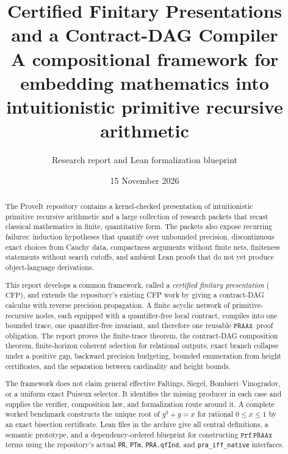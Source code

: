 \documentclass[11pt]{article}
\title{\textbf{Certified Finitary Presentations and a Contract-DAG Compiler}\\
\large A compositional framework for embedding mathematics into intuitionistic primitive recursive arithmetic}
\author{Research report and Lean formalization blueprint}
\date{15 November 2026}
\newcommand{\CFP}{\ensuremath{\mathrm{CFP}}}
\newcommand{\PRAAx}{\ensuremath{\mathtt{PRAAx}}}
\newcommand{\Prf}{\ensuremath{\mathtt{Prf}}}
\newcommand{\code}[1]{\texttt{#1}}
\begin{document}
\maketitle

\begin{abstract}
The ProveIt repository contains a kernel-checked presentation of intuitionistic
primitive recursive arithmetic and a large collection of research packets that
recast classical mathematics in finite, quantitative form.  The packets also
expose recurring failures: induction hypotheses that quantify over unbounded
precision, discontinuous exact choices from Cauchy data, compactness arguments
without finite nets, finiteness statements without search cutoffs, and ambient
Lean proofs that do not yet produce object-language derivations.

This report develops a common framework, called a \emph{certified finitary
presentation} (\CFP), and extends the repository's existing CFP work by giving
a contract-DAG calculus with reverse precision propagation.  A finite acyclic
network of primitive-recursive nodes, each equipped with a quantifier-free
local contract, compiles into one bounded trace, one quantifier-free invariant,
and therefore one reusable \PRAAx\ proof obligation.  The report proves the
finite-trace theorem, the contract-DAG composition theorem, finite-horizon
coherent selection for relational outputs, exact branch collapse under a
positive gap, backward precision budgeting, bounded enumeration from height
certificates, and the separation between cardinality and height bounds.

The framework does not claim general effective Faltings, Siegel,
Bombieri--Vinogradov, or a uniform exact Puiseux selector.  It identifies the
missing producer in each case and supplies the verifier, composition law, and
formalization route around it.  A complete worked benchmark constructs the
unique root of \(y^3+y=x\) for rational \(0\le x\le1\) by an exact bisection
certificate.  Lean files in the archive give all central definitions, a
semantic prototype, and a dependency-ordered blueprint for constructing
\(\Prf\,\PRAAx\) terms using the repository's actual \code{PR},
\code{PTm}, \code{PRA.qfInd}, and \code{pra\_iff\_native} interfaces.
\end{abstract}

\tableofcontents
\newpage














\end{document}
